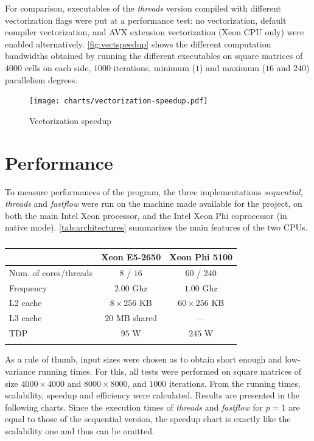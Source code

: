 \documentclass[a4paper,11pt]{article}
\begin{document}
For comparison, executables of the \emph{threads} version compiled with different vectorization flags were put at a performance test: no vectorization, default compiler vectorization, and AVX extension vectorization (Xeon CPU only) were enabled alternatively. \autoref{fig:vectspeedup} shows the different computation bandwidths obtained by running the different executables on square matrices of $4000$ cells on each side, $1000$ iterations, minimum ($1$) and maximum ($16$ and $240$) parallelism degrees.

\begin{figure}[htpb]
\centering
\texttt{[image: charts/vectorization-speedup.pdf]}
\caption{Vectorization speedup} \label{fig:vectspeedup}
\end{figure}

\section{Performance}

To measure performances of the program, the three implementations \emph{sequential}, \emph{threads} and \emph{fastflow} were run on the machine made available for the project, on both the main Intel Xeon processor, and the Intel Xeon Phi coprocessor (in native mode). \autoref{tab:architectures} summarizes the main features of the two CPUs.

\begin{table}[htb] \centering
\begin{tabular}{lcc}
\firsthline
	& Xeon E5-2650 & Xeon Phi 5100 \\\hline
	Num. of cores/threads & $8$ / $16$ & $60$ / $240$ \\
 	Frequency & $2.00$ Ghz & $1.00$ Ghz \\
 	L2 cache & $8 \times 256$ KB & $60 \times 256$ KB \\
 	L3 cache & $20$ MB shared & --- \\
 	TDP & $95$ W & $245$ W \\
\lasthline
\end{tabular}
\caption{} \label{tab:architectures}
\end{table}

As a rule of thumb, input sizes were chosen as to obtain short enough and low-variance running times. For this, all tests were performed on square matrices  of size $4000 \times 4000$ and $8000 \times 8000$, and $1000$ iterations. From the running times, scalability, speedup and efficiency were calculated. Results are presented in the following charts. Since the execution times of \emph{threads} and \emph{fastflow} for $p = 1$ are equal to those of the sequential version, the speedup chart is exactly like the scalability one and thus can be omitted.
\end{document}
